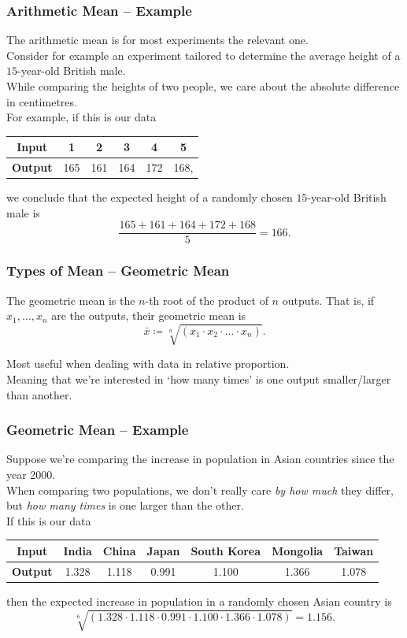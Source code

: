 \documentclass[aspectratio=169,11pt,svgnames,handout]{beamer}
\begin{document}
\begin{frame}
 \frametitle{Arithmetic Mean -- Example}
 The arithmetic mean is for most experiments the relevant one.\\
 \pause
 Consider for example an experiment tailored to determine the average height of
 a $15$-year-old British male.\\
 \pause
 While comparing the heights of two people, we care about the \alert{absolute}
 difference in centimetres.\\
 \pause
 For example, if this is our data
 \begin{center}
  \begin{tabular}{c|ccccc}
   \textbf{Input} & 1 & 2 & 3 & 4 & 5\\
   \midrule
   \textbf{Output} & 165 & 161 & 164 & 172 & 168,
  \end{tabular}
 \end{center}
 we conclude that the expected height of a randomly chosen $15$-year-old British
 male is
 \[
  \frac{165 + 161 + 164 + 172 + 168}{5} = 166.
 \]
\end{frame}

\begin{frame}
 \frametitle{Types of Mean -- Geometric Mean}
 \begin{tcolorbox}[title=Geometric Mean]
  The \alert{geometric mean} is the $n$-th root of the product of $n$ outputs.
  That is, if $x_1,\ldots,x_n$ are the outputs, their geometric mean is
  \[
   \bar{x} \coloneqq \sqrt[n]{(x_1 \cdot x_2 \cdot \ldots \cdot x_n)}.
  \]
 \end{tcolorbox}
 \pause
 Most useful when dealing with data in \alert{relative} proportion.\\
 \pause
 Meaning that we're interested in `\alert{how many times}' is one output
 smaller/larger than another.
\end{frame}

\begin{frame}
 \frametitle{Geometric Mean -- Example}
 Suppose we're comparing the increase in population in Asian countries since the
 year 2000.\\
 \pause
 When comparing two populations, we don't really care \emph{by how much} they
 differ, but \emph{how many times} is one larger than the other.\\
 \pause
 If this is our data
 \begin{center}
  \begin{tabular}{c|cccccc}
   \textbf{Input} & India & China & Japan & South Korea & Mongolia & Taiwan\\
   \midrule
   \textbf{Output} & 1.328 & 1.118 & 0.991 & 1.100 & 1.366 & 1.078
  \end{tabular}
 \end{center}
 then the expected increase in population in a randomly chosen Asian country is
 \[
  \sqrt[6]{(1.328 \cdot 1.118 \cdot 0.991 \cdot 1.100 \cdot 1.366 \cdot 1.078)}
  = 1.156.
 \]
\end{frame}
\end{document}
